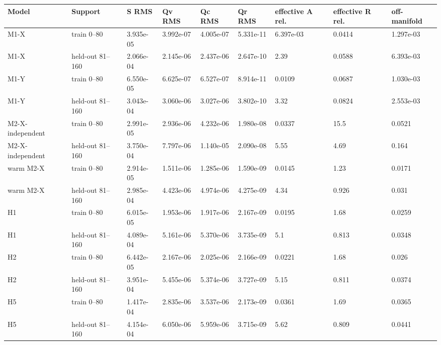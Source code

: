 \begin{tabular}{lllllllll}
\toprule
Model & Support & S RMS & Qv RMS & Qc RMS & Qr RMS & effective A rel. & effective R rel. & off-manifold \\
\midrule
M1-X & train 0--80 & 3.935e-05 & 3.992e-07 & 4.005e-07 & 5.331e-11 & 6.397e-03 & 0.0414 & 1.297e-03 \\
M1-X & held-out 81--160 & 2.066e-04 & 2.145e-06 & 2.437e-06 & 2.647e-10 & 2.39 & 0.0588 & 6.393e-03 \\
M1-Y & train 0--80 & 6.550e-05 & 6.625e-07 & 6.527e-07 & 8.914e-11 & 0.0109 & 0.0687 & 1.030e-03 \\
M1-Y & held-out 81--160 & 3.043e-04 & 3.060e-06 & 3.027e-06 & 3.802e-10 & 3.32 & 0.0824 & 2.553e-03 \\
M2-X-independent & train 0--80 & 2.991e-05 & 2.936e-06 & 4.232e-06 & 1.980e-08 & 0.0337 & 15.5 & 0.0521 \\
M2-X-independent & held-out 81--160 & 3.750e-04 & 7.797e-06 & 1.140e-05 & 2.090e-08 & 5.55 & 4.69 & 0.164 \\
warm M2-X & train 0--80 & 2.914e-05 & 1.511e-06 & 1.285e-06 & 1.590e-09 & 0.0145 & 1.23 & 0.0171 \\
warm M2-X & held-out 81--160 & 2.985e-04 & 4.423e-06 & 4.974e-06 & 4.275e-09 & 4.34 & 0.926 & 0.031 \\
H1 & train 0--80 & 6.015e-05 & 1.953e-06 & 1.917e-06 & 2.167e-09 & 0.0195 & 1.68 & 0.0259 \\
H1 & held-out 81--160 & 4.089e-04 & 5.161e-06 & 5.370e-06 & 3.735e-09 & 5.1 & 0.813 & 0.0348 \\
H2 & train 0--80 & 6.442e-05 & 2.167e-06 & 2.025e-06 & 2.166e-09 & 0.0221 & 1.68 & 0.026 \\
H2 & held-out 81--160 & 3.951e-04 & 5.455e-06 & 5.374e-06 & 3.727e-09 & 5.15 & 0.811 & 0.0374 \\
H5 & train 0--80 & 1.417e-04 & 2.835e-06 & 3.537e-06 & 2.173e-09 & 0.0361 & 1.69 & 0.0365 \\
H5 & held-out 81--160 & 4.154e-04 & 6.050e-06 & 5.959e-06 & 3.715e-09 & 5.62 & 0.809 & 0.0441 \\
\bottomrule
\end{tabular}
